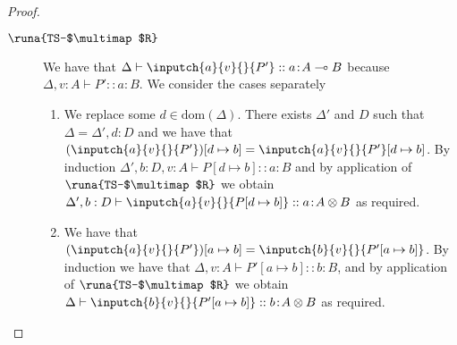 \begin{lemma}
\begin{proof}
\begin{description}

\item[$\runa{TS-$\multimap$R}$] We have that $\Delta\vdash \inputch{a}{v}{}{P'} :: a\!:\!A\multimap B$ because $\Delta,v:A\vdash P' :: a\!:\!B$. We consider the cases separately
\begin{enumerate}
    \item We replace some $d\in\text{dom}(\Delta)$. There exists $\Delta'$ and $D$ such that $\Delta=\Delta',d:D$ and we have that $(\inputch{a}{v}{}{P'})[d\mapsto b]=\inputch{a}{v}{}{P'}[d\mapsto b]$. By induction $\Delta',b:D,v:A\vdash P[d\mapsto b] :: a\!:\!B$ and by application of $\runa{TS-$\multimap$R}$ we obtain $\Delta',b:D\vdash \inputch{a}{v}{}{P[d\mapsto b]} :: a\!:\!A\otimes B$ as required. 
    
    \item We have that $(\inputch{a}{v}{}{P'})[a\mapsto b]=\inputch{b}{v}{}{P'[a\mapsto b]}$. By induction we have that $\Delta,v:A\vdash P'[a\mapsto b] :: b\!:\!B$, and by application of $\runa{TS-$\multimap$R}$ we obtain $\Delta\vdash \inputch{b}{v}{}{P'[a\mapsto b]} :: b\!:\!A\otimes B$ as required.
\end{enumerate}


\end{description}
\end{proof}
\end{lemma}
